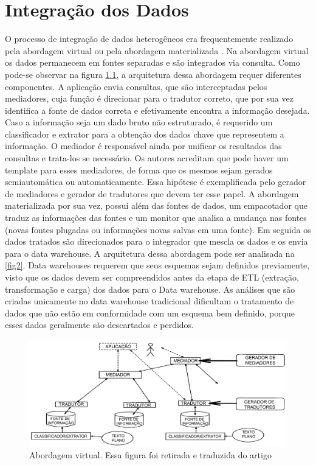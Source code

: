 \chapter{Integração dos Dados}

O processo de integração de dados heterogêneos era frequentemente realizado pela abordagem virtual \cite{chawathe1994tsimmis} ou pela abordagem materializada \cite{Widom:1995:RPD:221270.221319}.
Na abordagem virtual os dados permanecem em fontes separadas e são integrados via consulta. Como pode-se observar na figura \ref{fig1}, a arquitetura dessa abordagem requer diferentes componentes. A aplicação envia consultas, que são interceptadas pelos mediadores, cuja função é direcionar para o tradutor correto, que por sua vez identifica a fonte de dados correta e efetivamente encontra a informação desejada. Caso a informação seja um dado bruto não estruturado, é requerido um classificador e extrator para a obtenção dos dados chave que representem a informação. O mediador é responsável ainda por unificar os resultados das consultas e trata-los se necessário. Os autores acreditam que pode haver um template para esses mediadores, de forma que os mesmos sejam gerados semiautomática ou automaticamente. Essa hipótese é exemplificada pelo gerador de mediadores e gerador de tradutores que devem ter esse papel.
A abordagem materializada por sua vez, possui além das fontes de dados, um empacotador que traduz as informações das fontes e um monitor que analisa a mudança nas fontes (novas fontes plugadas ou informações novas salvas em uma fonte). Em seguida os dados tratados são direcionados para o integrador que mescla os dados e os envia para o data warehouse. A arquitetura dessa abordagem pode ser analisada na \ref{fig2}. Data warehouses requerem que seus esquemas sejam definidos previamente, visto que os dados devem ser compreendidos antes da etapa de ETL (extração, transformação e carga) dos dados para o Data warehouse. As análises que são criadas unicamente no data warehouse tradicional dificultam o tratamento de dados que não estão em conformidade com um esquema bem definido, porque esses dados geralmente são descartados e perdidos.

\begin{figure}[!ht]
\centering
\includegraphics[width=0.3\linewidth]{figuras/TSIMMIS.png}
\caption{Abordagem virtual. Essa figura foi retirada e traduzida do artigo \cite{chawathe1994tsimmis}}
\label{fig1}
\end{figure}

